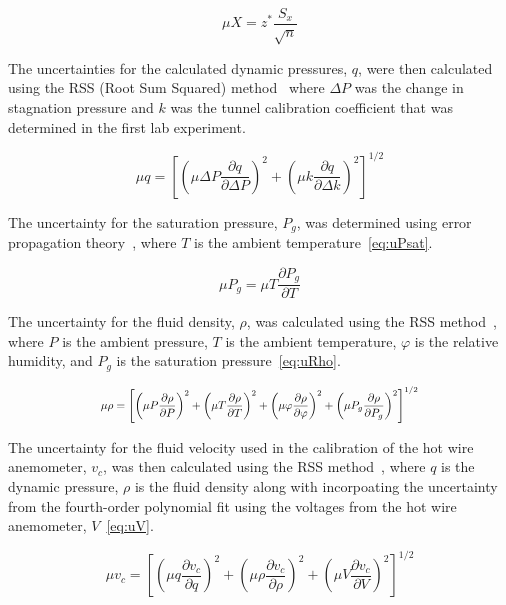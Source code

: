 \documentclass[journal,letterpaper]{IEEEtran}
\begin{document}
\begin{equation} \label{eq:conf}
    \mu X = z^* \frac{S_x}{\sqrt{n}}
\end{equation}

The uncertainties for the calculated dynamic pressures, $q$, were then calculated using the RSS (Root Sum Squared) method~\cite{MoMLecture} where $\Delta P$ was the change in stagnation pressure and $k$ was the tunnel calibration coefficient that was determined in the first lab experiment.

\begin{equation} \label{eq:uq}
    \mu q = \left[\left(\mu \Delta P \frac{\partial q}{\partial \Delta P}\right)^2 + \left(\mu k \frac{\partial q}{\partial \Delta k}\right)^2\right]^{1/2}
\end{equation}

The uncertainty for the saturation pressure, $P_g$, was determined using error propagation theory~\cite{errorprop}, where $T$ is the ambient temperature~\eqref{eq:uPsat}.

\begin{equation} \label{eq:uPsat}
    \mu P_g = \mu T \frac{\partial P_g}{\partial T}
\end{equation}

The uncertainty for the fluid density, $\rho$, was calculated using the RSS method~\cite{MoMLecture}, where $P$ is the ambient pressure, $T$ is the ambient temperature, $\varphi$ is the relative humidity, and $P_g$ is the saturation pressure~\eqref{eq:uRho}.

\begin{equation} \label{eq:uRho}
    \resizebox{227pt}{!}{$\displaystyle{\mu \rho = \left[\left(\mu P \frac{\partial \rho}{\partial P}\right)^2 + \left(\mu T \frac{\partial \rho}{\partial T}\right)^2 + \left(\mu \varphi \frac{\partial \rho}{\partial \varphi}\right)^2 + \left(\mu P_g \frac{\partial \rho}{\partial P_g}\right)^2\right]^{1/2}}$}
\end{equation}

The uncertainty for the fluid velocity used in the calibration of the hot wire anemometer, $v_c$, was then calculated using the RSS method~\cite{MoMLecture}, where $q$ is the dynamic pressure, $\rho$ is the fluid density along with incorpoating the uncertainty from the fourth-order polynomial fit using the voltages from the hot wire anemometer, $V$~\eqref{eq:uV}.

\begin{equation} \label{eq:uV}
    \mu v_c = \left[\left(\mu q \frac{\partial v_c}{\partial q}\right)^2 + \left(\mu \rho \frac{\partial v_c}{\partial \rho}\right)^2 + \left(\mu V \frac{\partial v_c}{\partial V}\right)^2\right]^{1/2}
\end{equation}
\end{document}
